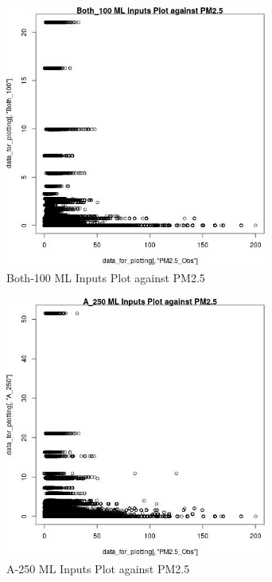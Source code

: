 \begin{figure} 
\centering  
\includegraphics[width=0.77\textwidth]{Code_Outputs/ML_input_report_ML_input_PM25_Step5_part_d_de_duplicated_aves_ML_input_Both_100vPM25_Obs.jpg} 
\caption{\label{fig:ML_input_report_ML_input_PM25_Step5_part_d_de_duplicated_aves_ML_inputBoth_100vPM25_Obs}Both-100 ML Inputs Plot against PM2.5} 
\end{figure} 
 

\begin{figure} 
\centering  
\includegraphics[width=0.77\textwidth]{Code_Outputs/ML_input_report_ML_input_PM25_Step5_part_d_de_duplicated_aves_ML_input_A_250vPM25_Obs.jpg} 
\caption{\label{fig:ML_input_report_ML_input_PM25_Step5_part_d_de_duplicated_aves_ML_inputA_250vPM25_Obs}A-250 ML Inputs Plot against PM2.5} 
\end{figure} 
 

